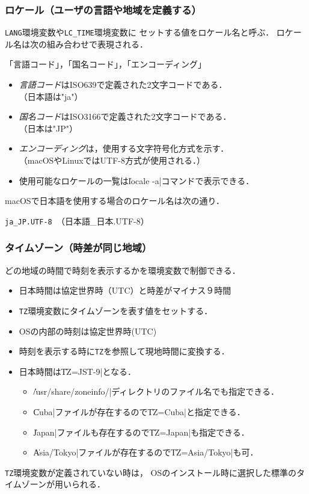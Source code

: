 \documentclass{beamer}                 %
\begin{document}
\begin{frame}[fragile]
  \frametitle{ロケール（ユーザの言語や地域を定義する）}
  \texttt{LANG}環境変数や\texttt{LC\_TIME}環境変数に
  セットする値をロケール名と呼ぶ．
  ロケール名は次の組み合わせで表現される．
  \centerline{「言語コード」，「国名コード」，「エンコーディング」}
\vfill
\begin{itemize}
\item \emph{言語コード}はISO639で定義された2文字コードである．\\
  （日本語は"ja"）
\item \emph{国名コード}はISO3166で定義された2文字コードである．\\
  （日本は"JP"）
\item \emph{エンコーディング}は，使用する文字符号化方式を示す．\\
  （macOSやLinuxではUTF-8方式が使用される．）
\item 使用可能なロケールの一覧は\|locale -a|コマンドで表示できる．
\end{itemize}
\vfill
macOSで日本語を使用する場合のロケール名は次の通り．
\centerline{\texttt{ja\_JP.UTF-8 }（日本語\_日本.UTF-8）}
\end{frame}

\begin{frame}[fragile]
  \frametitle{タイムゾーン（時差が同じ地域）}
  どの地域の時間で時刻を表示するかを環境変数で制御できる．
  \vfill
  \begin{itemize}
  \item 日本時間は協定世界時（UTC）と時差がマイナス９時間
  \item \texttt{TZ}環境変数にタイムゾーンを表す値をセットする．
  \item OSの内部の時刻は協定世界時(UTC)
  \item 時刻を表示する時に\texttt{TZ}を参照して現地時間に変換する．
  \item 日本時間は\|TZ=JST-9|となる．
    \begin{itemize}
      \item \|/usr/share/zoneinfo/|ディレクトリのファイル名でも指定できる．
      \item \|Cuba|ファイルが存在するので\|TZ=Cuba|と指定できる．
      \item \|Japan|ファイルも存在するので\|TZ=Japan|も指定できる．
      \item \|Asia/Tokyo|ファイルが存在するので\|TZ=Asia/Tokyo|も可．
    \end{itemize}
  \end{itemize}
  \vfill
\texttt{TZ}環境変数が定義されていない時は，
OSのインストール時に選択した標準のタイムゾーンが用いられる．
\end{frame}
\end{document}
